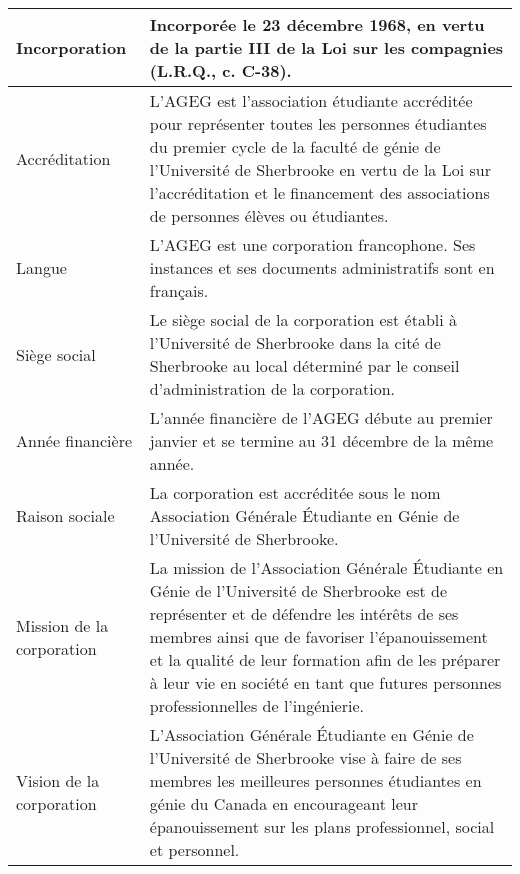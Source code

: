 
\begin{tabular}[c]{m{}|m{}} 

\hline 

Incorporation & Incorporée le 23 décembre 1968, en vertu de la partie III de la Loi sur les compagnies (L.R.Q., c. C-38).\\\hline 

Accréditation & L'AGEG est l'association étudiante accréditée pour représenter toutes les personnes étudiantes du premier cycle de la faculté de génie de l'Université de Sherbrooke en vertu de la Loi sur l'accréditation et le financement des associations de personnes élèves ou étudiantes.\\\hline 

Langue & L'AGEG est une corporation francophone. Ses instances et ses documents administratifs sont en français. \\\hline 

Siège social & Le siège social de la corporation est établi à l'Université de Sherbrooke dans la cité de Sherbrooke au local déterminé par le conseil d'administration de la corporation.\\\hline 

Année financière & L'année financière de l'AGEG débute au premier janvier et se termine au 31 décembre de la même année. \\\hline 

Raison sociale & La corporation est accréditée sous le nom Association Générale Étudiante en Génie de l'Université de Sherbrooke.\\\hline 

Mission de la corporation & La mission de l'Association Générale Étudiante en Génie de l'Université de Sherbrooke est de représenter et de défendre les intérêts de ses membres ainsi que de favoriser l'épanouissement et la qualité de leur formation afin de les préparer à leur vie en société en tant que futures personnes professionnelles de l'ingénierie.\\\hline

Vision de la corporation & L'Association Générale Étudiante en Génie de l'Université de Sherbrooke vise à faire de ses membres les meilleures personnes étudiantes en génie du Canada en encourageant leur épanouissement sur les plans professionnel, social et personnel.\\\hline 

\end{tabular} 

